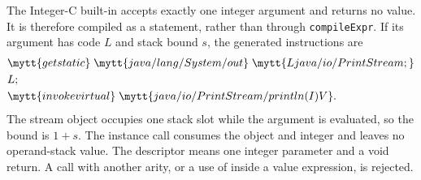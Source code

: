 \item The Integer-C built-in  accepts exactly one integer argument and returns no value.
      It is therefore compiled as a statement, rather than through \texttt{compileExpr}.
      If its argument has code $L$ and stack bound $s$, the generated instructions are \[
      \begin{aligned}
      &\mytt{getstatic}\;\mytt{java/lang/System/out}\;\mytt{Ljava/io/PrintStream;}\\ &L;\\ &\mytt{invokevirtual}\;\mytt{java/io/PrintStream/println(I)V}.
      \end{aligned}
      \] The stream object occupies one stack slot while the argument is evaluated, so the bound is $1+s$.
      The instance call consumes the object and integer and leaves no operand-stack value.
      The descriptor  means one integer parameter and a void return.
      A call with another arity, or a use of  inside a value expression, is rejected.
